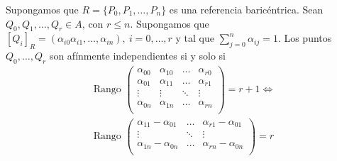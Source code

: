 \documentclass[14pt]{book}
\begin{document}
\begin{tm}
	Supongamos que $R = \{P_0, P_1, \dots, P_n\}$ es una referencia baricéntrica. Sean $Q_0, Q_1, \dots, Q_r \in A$, con $r \leq n$. Supongamos que $[Q_i]_R = (\alpha_{i0} \alpha_{i1}, \dots, \alpha_{in}),\ i = 0, \dots, r$ y tal que $\sum_{j=0}^{n} \alpha_{ij} = 1$. Los puntos $Q_0, \dots, Q_r$ son afínmente independientes si y solo si
	\begin{align*}
	\text{Rango }\left(\begin{array}{cccc}
	\alpha_{00} & \alpha_{10} & \dots & \alpha_{r0} \\
	\alpha_{01} & \alpha_{11} & \dots & \alpha_{r1} \\
	\vdots & \vdots & \ddots & \vdots \\
	\alpha_{0n} & \alpha_{1n} & \dots & \alpha_{rn} \\
	\end{array}
	\right) = r + 1 \iff\\
	\text{Rango }\left(\begin{array}{ccc}
	\alpha_{11} - \alpha_{01} & \dots & \alpha_{r1} - \alpha_{01} \\
	\vdots & \ddots & \vdots \\
	\alpha_{1n} - \alpha_{0n} & \dots & \alpha_{rn} - \alpha_{0n} \\
	\end{array}
	\right) = r
	\end{align*}
\end{tm}
\end{document}
